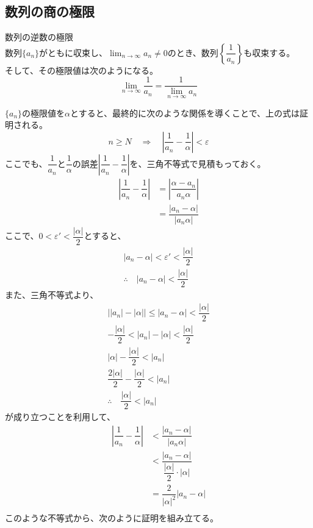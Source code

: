 \documentclass[../../math-imaging]{subfiles}
\begin{document}
\subsection{数列の商の極限}

\begin{theorem}{数列の逆数の極限}\quad\\
  数列$\{a_n\}$がともに収束し、$\displaystyle\lim_{n \to \infty} a_n \neq 0$のとき、数列$\left\{\dfrac{1}{a_n}\right\}$も収束する。\\
  そして、その極限値は次のようになる。
  \LARGE
  \begin{equation}
    \lim_{n \to \infty} \dfrac{1}{a_n} = \dfrac{1}{\displaystyle\lim_{n \to \infty} a_n}
  \end{equation}
\end{theorem}

$\{a_n\}$の極限値を$\alpha$とすると、最終的に次のような関係を導くことで、上の式は証明される。
\begin{equation}
  n \geq N \quad \Longrightarrow \quad \left|\dfrac{1}{a_n} - \dfrac{1}{\alpha}\right| < \varepsilon
\end{equation}
ここでも、$\dfrac{1}{a_n}$と$\dfrac{1}{\alpha}$の誤差$\left|\dfrac{1}{a_n} - \dfrac{1}{\alpha}\right|$を、三角不等式で見積もっておく。
\begin{align*}
  \left|\dfrac{1}{a_n} - \dfrac{1}{\alpha}\right| &= \left|\dfrac{\alpha - a_n}{a_n \alpha}\right| \\
  &= \dfrac{|a_n - \alpha|}{|a_n \alpha|}
\end{align*}
ここで、$0< \varepsilon' < \dfrac{|\alpha|}{2}$とすると、
\begin{gather*}
  \left|a_n - \alpha\right| < \varepsilon' < \dfrac{|\alpha|}{2} \\
  \therefore \quad \left|a_n-\alpha\right| < \dfrac{\left|\alpha\right|}{2}
\end{gather*}
また、三角不等式より、
\begin{gather*}
  \left| |a_n| - |\alpha| \right| \leq |a_n - \alpha| < \dfrac{\left|\alpha\right|}{2} \\
  - \dfrac{|\alpha|}{2} < |a_n| - |\alpha| < \dfrac{|\alpha|}{2} \\
  |\alpha| - \dfrac{|\alpha|}{2} < |a_n| \\
  \dfrac{2|\alpha|}{2} - \dfrac{|\alpha|}{2} < |a_n| \\
  \therefore \quad \dfrac{|\alpha|}{2} < |a_n|
\end{gather*}
が成り立つことを利用して、
\begin{align*}
  \left|\dfrac{1}{a_n} - \dfrac{1}{\alpha}\right| &< \dfrac{|a_n - \alpha|}{|a_n \alpha|} \\
  &< \dfrac{|a_n - \alpha|}{\dfrac{\left|\alpha\right|}{2} \cdot \left|\alpha\right|} \\
  &= \dfrac{2}{|\alpha|^2}|a_n - \alpha| \\
\end{align*}
このような不等式から、次のように証明を組み立てる。
\end{document}
